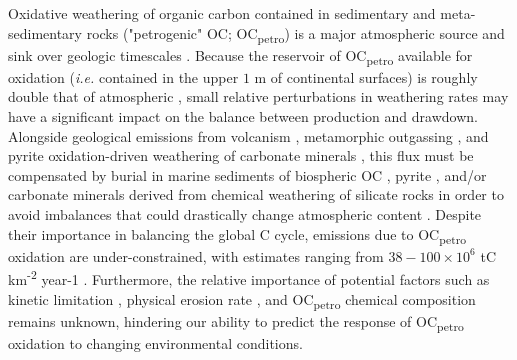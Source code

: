 Oxidative weathering of organic carbon contained in sedimentary and meta-sedimentary rocks ("petrogenic" OC; OC\textsubscript{petro}) is a major atmospheric  source and  sink over geologic timescales \citep[$\geq 10^{6}$ yr;][]{Berner:1989vr,Wildman:2004wf,Hayes:2006ca,Petsch:2014ct}. Because the reservoir of OC\textsubscript{petro} available for oxidation (\textit{i.e.} contained in the upper $1$ m of continental surfaces) is roughly double that of atmospheric  \citep{Copard:2007bf}, small relative perturbations in weathering rates may have a significant impact on the balance between  production and drawdown. Alongside geological  emissions from volcanism \citep{Marty:1998vo}, metamorphic outgassing \citep{Becker:2008bd}, and pyrite oxidation-driven weathering of carbonate minerals \citep{Torres:2014cx}, this flux must be compensated by burial in marine sediments of biospheric OC \citep[OC\textsubscript{bio};][]{FranceLanord:1997ua,Galy:2007ev,Hilton:2008fo}, pyrite \citep{Berner:1989vr,Hayes:2006ca}, and/or carbonate minerals derived from chemical weathering of silicate rocks \citep{Berner:1989vr} in order to avoid imbalances that could drastically change atmospheric  content \citep{Berner:1997df}. Despite their importance in balancing the global C cycle,  emissions due to OC\textsubscript{petro} oxidation are under-constrained, with estimates ranging from $38 - 100 \times 10^{6}$ tC km\textsuperscript{-2} year-1 \citep{Petsch:2014ct}. Furthermore, the relative importance of potential factors such as kinetic limitation \citep{Chang:1999vo,Petsch:2001eq}, physical erosion rate \citep{Hilton:2014dh}, and OC\textsubscript{petro} chemical composition \citep{Galy:2008ff} remains unknown, hindering our ability to predict the response of OC\textsubscript{petro} oxidation to changing environmental conditions.

